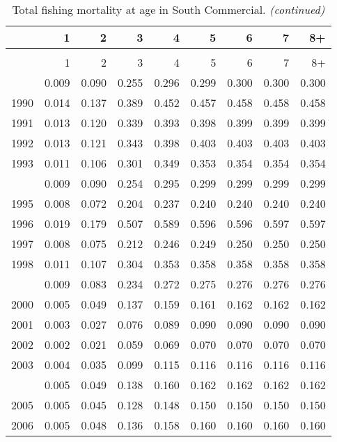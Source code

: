 \documentclass[
]{article}
\begin{document}
\begin{longtable}[t]{lrrrrrrrr}
\caption{\label{tab:South_Commercial-fleet-FAA-table}Total fishing mortality at age in South Commercial.}\\
\toprule
  & 1 & 2 & 3 & 4 & 5 & 6 & 7 & 8+\\
\midrule
\endfirsthead
\caption[]{Total fishing mortality at age in South Commercial. \textit{(continued)}}\\
\toprule
  & 1 & 2 & 3 & 4 & 5 & 6 & 7 & 8+\\
\midrule
\endhead

\endfoot
\bottomrule
\endlastfoot
1989 & 0.009 & 0.090 & 0.255 & 0.296 & 0.299 & 0.300 & 0.300 & 0.300\\
1990 & 0.014 & 0.137 & 0.389 & 0.452 & 0.457 & 0.458 & 0.458 & 0.458\\
1991 & 0.013 & 0.120 & 0.339 & 0.393 & 0.398 & 0.399 & 0.399 & 0.399\\
1992 & 0.013 & 0.121 & 0.343 & 0.398 & 0.403 & 0.403 & 0.403 & 0.403\\
1993 & 0.011 & 0.106 & 0.301 & 0.349 & 0.353 & 0.354 & 0.354 & 0.354\\
\addlinespace
1994 & 0.009 & 0.090 & 0.254 & 0.295 & 0.299 & 0.299 & 0.299 & 0.299\\
1995 & 0.008 & 0.072 & 0.204 & 0.237 & 0.240 & 0.240 & 0.240 & 0.240\\
1996 & 0.019 & 0.179 & 0.507 & 0.589 & 0.596 & 0.596 & 0.597 & 0.597\\
1997 & 0.008 & 0.075 & 0.212 & 0.246 & 0.249 & 0.250 & 0.250 & 0.250\\
1998 & 0.011 & 0.107 & 0.304 & 0.353 & 0.358 & 0.358 & 0.358 & 0.358\\
\addlinespace
1999 & 0.009 & 0.083 & 0.234 & 0.272 & 0.275 & 0.276 & 0.276 & 0.276\\
2000 & 0.005 & 0.049 & 0.137 & 0.159 & 0.161 & 0.162 & 0.162 & 0.162\\
2001 & 0.003 & 0.027 & 0.076 & 0.089 & 0.090 & 0.090 & 0.090 & 0.090\\
2002 & 0.002 & 0.021 & 0.059 & 0.069 & 0.070 & 0.070 & 0.070 & 0.070\\
2003 & 0.004 & 0.035 & 0.099 & 0.115 & 0.116 & 0.116 & 0.116 & 0.116\\
\addlinespace
2004 & 0.005 & 0.049 & 0.138 & 0.160 & 0.162 & 0.162 & 0.162 & 0.162\\
2005 & 0.005 & 0.045 & 0.128 & 0.148 & 0.150 & 0.150 & 0.150 & 0.150\\
2006 & 0.005 & 0.048 & 0.136 & 0.158 & 0.160 & 0.160 & 0.160 & 0.160\\

\end{longtable}
\end{document}
